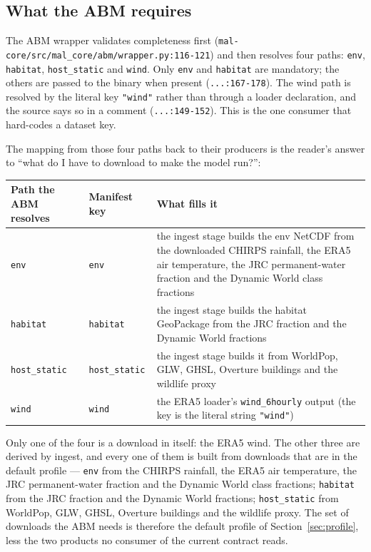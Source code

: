 \documentclass[11pt,a4paper]{article}
\newcommand{\code}[1]{\texttt{#1}}
\begin{document}
\subsection{What the ABM requires}

The ABM wrapper validates completeness first
(\code{mal-core/src/mal\_core/abm/wrapper.py:116-121}) and then resolves
four paths: \code{env}, \code{habitat}, \code{host\_static} and \code{wind}. Only \code{env} and \code{habitat} are mandatory; the
others are passed to the binary when present
(\code{...:167-178}). The wind path is resolved by the literal key
\code{"wind"} rather than through a loader declaration, and the source says
so in a comment (\code{...:149-152}). This is the one consumer that
hard-codes a dataset key.

The mapping from those four paths back to their producers is the reader's
answer to ``what do I have to download to make the model run?'':

\begin{longtable}{@{}llp{}@{}}
\toprule
Path the ABM resolves & Manifest key & What fills it \\
\midrule
\endhead
\code{env} & \code{env} & the ingest stage builds the env NetCDF from the
downloaded CHIRPS rainfall, the ERA5 air temperature, the JRC
permanent-water fraction and the Dynamic World class fractions \\
\code{habitat} & \code{habitat} & the ingest stage builds the habitat
GeoPackage from the JRC fraction and the Dynamic World fractions \\
\code{host\_static} & \code{host\_static} & the ingest stage builds it from
WorldPop, GLW, GHSL, Overture buildings and the wildlife proxy \\
\code{wind} & \code{wind} & the ERA5 loader's \code{wind\_6hourly} output
(the key is the literal string \code{"wind"}) \\
\bottomrule
\end{longtable}
\label{tab:abm-paths}

Only one of the four is a download in itself: the ERA5 wind. The other three
are derived by ingest, and every one of them is built from downloads that
are in the default profile --- \code{env} from the CHIRPS rainfall, the
ERA5 air temperature, the JRC permanent-water fraction and the Dynamic
World class fractions; \code{habitat} from the JRC fraction and the Dynamic
World fractions; \code{host\_static} from WorldPop, GLW, GHSL, Overture
buildings and the wildlife proxy. The set of downloads the ABM needs is therefore the
default profile of Section~\ref{sec:profile}, less the two products no
consumer of the current contract reads.
\end{document}
